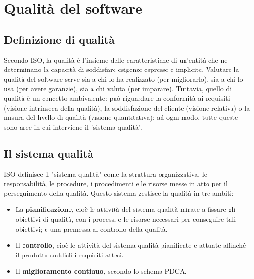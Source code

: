 \documentclass[a4paper]{article}
\begin{document}
	


		
	\section{Qualità del software}


		
	\subsection{Definizione di qualità}

		
Secondo ISO, la qualità è l'insieme delle caratteristiche di un'entità che ne determinano la capacità di soddisfare esigenze espresse e implicite. Valutare la qualità del software serve sia a chi lo ha realizzato (per migliorarlo), sia a chi lo usa (per avere garanzie), sia a chi valuta (per imparare). Tuttavia, quello di qualità è un concetto ambivalente: può riguardare la conformità ai requisiti (visione intrinseca della qualità), la soddisfazione del cliente (visione relativa) o la misura del livello di qualità (visione quantitativa); ad ogni modo, tutte queste sono aree in cui interviene il "sistema qualità".

		
	\subsection{Il sistema qualità}

		
ISO definisce il "sistema qualità" come la struttura organizzativa, le responsabilità, le procedure, i procedimenti e le risorse messe in atto per il perseguimento della qualità. Questo sistema gestisce la qualità in tre ambiti:
		
	\begin{itemize}
		
			
	\item La \textbf{pianificazione}, cioè le attività del sistema qualità mirate a fissare gli obiettivi di qualità, con i processi e le risorse necessari per conseguire tali obiettivi; è una premessa al controllo della qualità.
			
	\item Il \textbf{controllo}, cioè le attività del sistema qualità pianificate e attuate affinché il prodotto soddisfi i requisiti attesi.
			
	\item Il \textbf{miglioramento continuo}, secondo lo schema PDCA.
		
	\end{itemize}
\end{document}
